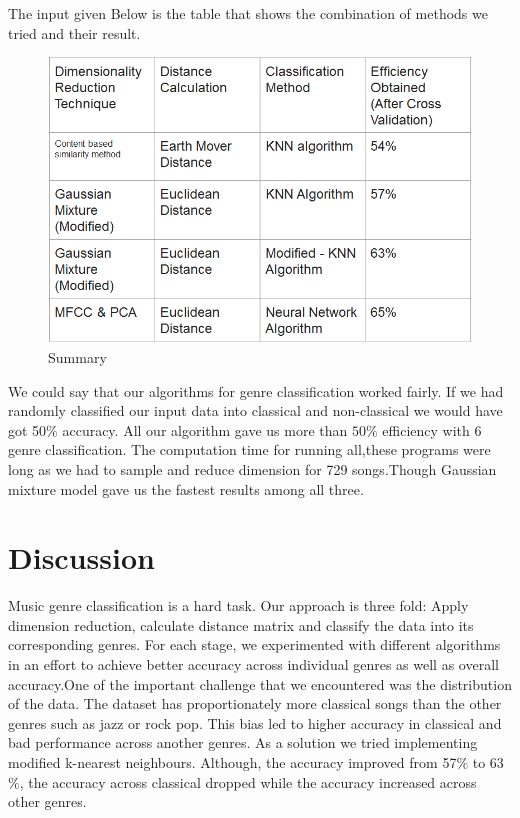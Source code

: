 \documentclass[12pt]{article}
\begin{document}
The input given Below is the table that shows the combination of methods we tried and their result.
\begin{figure}[H]
\center
\includegraphics [scale=0.7]{table.png}
\caption{Summary}
\end{figure}
We could say that our algorithms for genre classification worked fairly. If we had randomly classified our input data into classical and non-classical we would have got 50$\%$ accuracy. All our algorithm gave us more than $50\%$ efficiency with 6 genre classification.
The computation time for running all,these programs were long as we had to sample and reduce dimension for 729 songs.Though Gaussian mixture model gave us the fastest results among all three.
\section{Discussion}\label{sec:disc}
Music genre classification is a hard task. Our approach is three fold: Apply dimension reduction, calculate distance matrix and classify the data into its corresponding genres. For each stage, we experimented with different algorithms in an effort to achieve better accuracy across individual genres as well as overall accuracy.One of the important challenge that we encountered was the distribution of the data. The dataset has proportionately more classical songs than the other genres such as jazz or rock pop. This bias led to higher accuracy in classical and bad performance across another genres. As a solution we tried implementing modified k-nearest neighbours. Although, the accuracy improved from 57$\%$ to 63$\%$, the accuracy across classical dropped while the accuracy increased across other genres.
\end{document}
